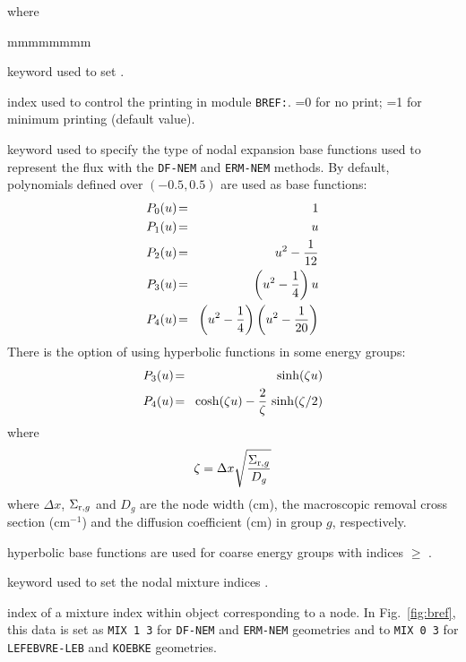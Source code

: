 \noindent where
\begin{ListeDeDescription}{mmmmmmmm}

\item[\moc{EDIT}] keyword used to set .

\item[\dusa{iprint}] index used to control the printing in module {\tt BREF:}. =0 for no print; =1 for minimum printing (default value).

\item[\moc{HYPE}] keyword used to specify the type of nodal expansion base functions used to represent the flux with the {\tt DF-NEM} and {\tt ERM-NEM}
methods. By default, polynomials defined over $(-0.5,0.5)$ are used as base functions:
\begin{eqnarray}
\nonumber P_0(u)\negthinspace &=&\negthinspace 1\\
\nonumber P_1(u)\negthinspace &=&\negthinspace u\\
\nonumber P_2(u)\negthinspace &=&\negthinspace u^2-{1\over 12}\\
\nonumber P_3(u)\negthinspace &=&\negthinspace \left( u^2-{1\over 4}\right)u\\
P_4(u)\negthinspace &=&\negthinspace \left( u^2-{1\over 4}\right)\left( u^2-{1\over 20}\right)
\end{eqnarray}
There is the option of using hyperbolic functions in some energy groups:
\begin{eqnarray}
\nonumber P_3(u)\negthinspace &=&\negthinspace \sinh(\zeta u)\\
P_4(u)\negthinspace &=&\negthinspace \cosh(\zeta u)-{2\over \zeta}\, \sinh(\zeta/2)
\end{eqnarray}
\noindent where
\begin{equation}
\zeta=\Delta x\sqrt{\Sigma_{{\rm r},g} \over D_g}
\end{equation}
\noindent where $\Delta x$, $\Sigma_{{\rm r},g}$ and $D_g$ are the node width (cm), the macroscopic removal cross section (cm$^{-1}$)
and the diffusion coefficient (cm) in group $g$, respectively.

\item[\dusa{igmax}] hyperbolic base functions are used for coarse energy groups with indices $\ge$ .

\item[\moc{MIX}] keyword used to set the nodal mixture indices .

\item[\dusa{imix}] index of a mixture index within object  corresponding to a node. In Fig.~\ref{fig:bref}, this data
is set as {\tt MIX 1 3} for {\tt DF-NEM} and {\tt ERM-NEM} geometries and to {\tt MIX 0 3} for {\tt LEFEBVRE-LEB} and {\tt KOEBKE}
geometries.


\end{ListeDeDescription}
